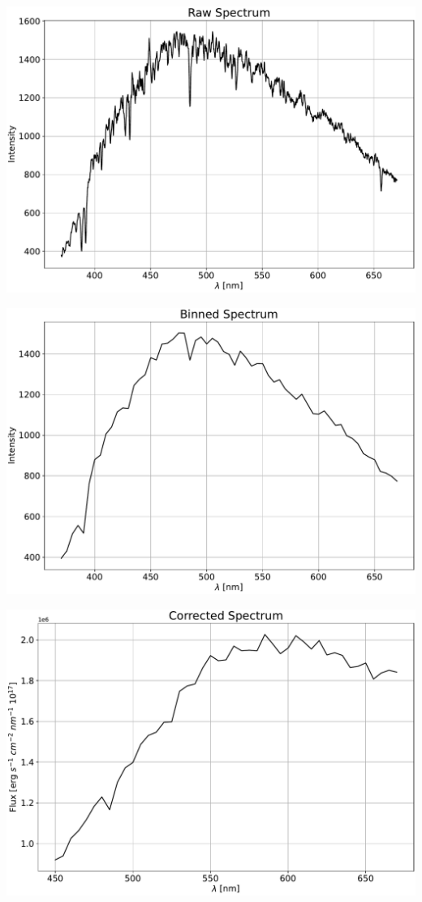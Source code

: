 \documentclass[a4paper]{article}
\newenvironment{Figure}
	{\par\medskip\noindent\minipage{\linewidth}}
	{\endminipage\par\medskip}
\begin{document}
		\begin{Figure}
			\centering
			\includegraphics[width=\linewidth]{Polaris_raw.pdf}
			\label{fig:pol_raw}
		\end{Figure}
		\begin{Figure}
			\centering
			\includegraphics[width=0.95\linewidth]{Polaris_bin.pdf}
			\label{fig:pol_bin}
		\end{Figure}
		\begin{Figure}
			\centering
			\includegraphics[width=0.95\linewidth]{Polaris_corr.pdf}
			\label{fig:pol_corr}
		\end{Figure}
		
\end{document}
